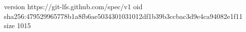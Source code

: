 version https://git-lfs.github.com/spec/v1
oid sha256:479529965778b1a8fb6ae5034301031012df1b39b3ccbac3d9e4ca94082e1f11
size 1015
